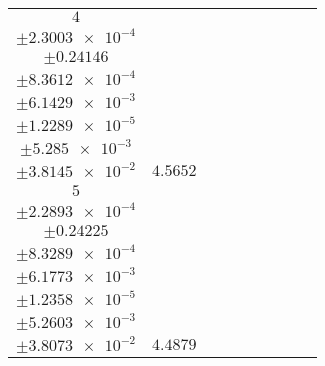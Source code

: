 \documentclass[8pt]{article}
\begin{document}
\begin{longtable}[l]{c c c c c c c c c}
$\num{4}$ & \begin{tabular}[c]{@{}c@{}}$\num{5.5353e-2}$ \\ $\pm\num{2.3003e-4}$\end{tabular} & \begin{tabular}[c]{@{}c@{}}$\num{0.17295}$ \\ $\pm\num{0.24146}$\end{tabular} & \begin{tabular}[c]{@{}c@{}}$\num{9.966}$ \\ $\pm\num{8.3612e-4}$\end{tabular} & \begin{tabular}[c]{@{}c@{}}$\num{2.0412e+3}$ \\ $\pm\num{6.1429e-3}$\end{tabular} & \begin{tabular}[c]{@{}c@{}}$\num{4.0836}$ \\ $\pm\num{1.2289e-5}$\end{tabular} & \begin{tabular}[c]{@{}c@{}}$\num{1.1886}$ \\ $\pm\num{5.285e-3}$\end{tabular} & \begin{tabular}[c]{@{}c@{}}$\num{4.0276}$ \\ $\pm\num{3.8145e-2}$\end{tabular} & $\num{4.5652}$\\
$\num{5}$ & \begin{tabular}[c]{@{}c@{}}$\num{5.4926e-2}$ \\ $\pm\num{2.2893e-4}$\end{tabular} & \begin{tabular}[c]{@{}c@{}}$\num{-0.87291}$ \\ $\pm\num{0.24225}$\end{tabular} & \begin{tabular}[c]{@{}c@{}}$\num{-10.384}$ \\ $\pm\num{8.3289e-4}$\end{tabular} & \begin{tabular}[c]{@{}c@{}}$\num{2.0642e+3}$ \\ $\pm\num{6.1773e-3}$\end{tabular} & \begin{tabular}[c]{@{}c@{}}$\num{4.1295}$ \\ $\pm\num{1.2358e-5}$\end{tabular} & \begin{tabular}[c]{@{}c@{}}$\num{1.179}$ \\ $\pm\num{5.2603e-3}$\end{tabular} & \begin{tabular}[c]{@{}c@{}}$\num{4.0089}$ \\ $\pm\num{3.8073e-2}$\end{tabular} & $\num{4.4879}$\\

\end{longtable}
\end{document}
